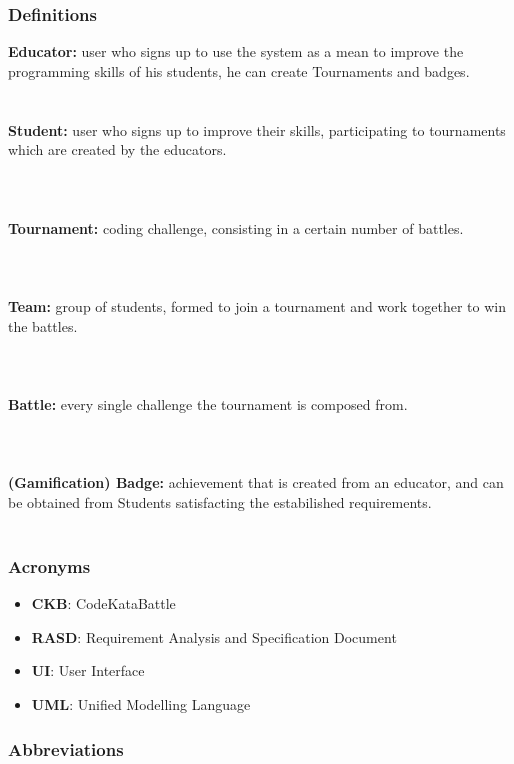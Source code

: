 \documentclass{article}
\begin{document}
\subsubsection{Definitions\\}
\textbf{Educator:} user who signs up to use the system as a mean to improve the programming skills of his students, he can create Tournaments
and badges.\\\\
\textbf{\\Student:} user who signs up to improve their skills, participating to tournaments which are created by the educators. \\\\\\
\textbf{\\Tournament:} coding challenge, consisting in a certain number of battles.\\\\\\
\textbf{\\Team:} group of students, formed to join a tournament and work together to win the battles.\\\\\\
\textbf{\\Battle:} every single challenge the tournament is composed from. \\\\\\
\textbf{\\(Gamification) Badge:} achievement that is created from an educator, and can be obtained from Students satisfacting the estabilished requirements.\\\\
\textbf{}
\subsubsection{Acronyms}
\begin{itemize}
    \item \textbf{CKB}: CodeKataBattle
    \item \textbf{RASD}: Requirement Analysis and Specification Document
    \item \textbf{UI}: User Interface
    \item \textbf{UML}: Unified Modelling Language
\end{itemize}

\subsubsection{Abbreviations}
\end{document}

